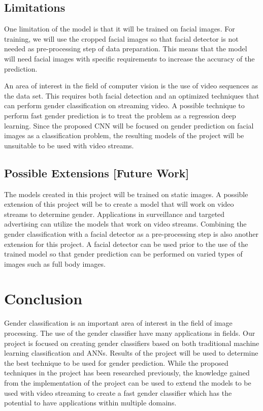 \documentclass[conference]{IEEEtran}
\begin{document}
\subsection{Limitations}
One limitation of the model is that it will be trained on facial images. For training, we will use the cropped facial images so that facial detector is not needed as pre-processing step of 
data preparation. This means that the model will need facial images with specific requirements to increase the accuracy of the prediction.

An area of interest in the field of computer vision is the use of video sequences as the data set. This requires both facial detection and an optimized techniques that can perform gender
classification on streaming video. A possible technique to perform fast gender prediction is to treat the problem as a regression deep learning. Since the proposed CNN will be focused on 
gender prediction on facial images as a classification problem, the resulting models of the project will be unsuitable to be used with video streams.

\subsection{Possible Extensions [Future Work]}
The models created in this project will be trained on static images. A possible extension of this project will be to create a model that will work on video streams to determine gender.
Applications in surveillance and targeted advertising can utilize the models that work on video streams. Combining the gender classification with a facial detector as a pre-processing step is
also another extension for this project. A facial detector can be used prior to the use of the trained model so that gender prediction can be performed on varied types of images such as 
full body images.

\section{Conclusion}
Gender classification is an important area of interest in the field of image processing. The use of the gender classifier have many applications in fields. Our project is focused on creating 
gender classifiers based on both traditional machine learning classification and ANNs. Results of the project will be used to determine the best technique to be used for gender prediction. 
While the proposed techniques in the project has been researched previously, the knowledge gained from the implementation of the project can be used to extend the models to be used with
video streaming to create a fast gender classifier which has the potential to have applications within multiple domains.




\end{document}
